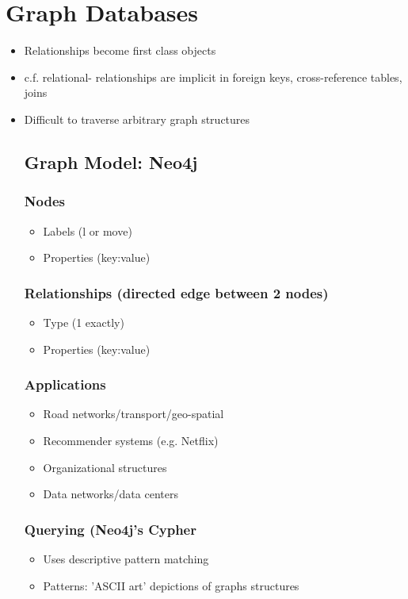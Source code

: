 \documentclass[12pt]{article}
\begin{document}
	\section*{Graph Databases}
		\begin{itemize}
			\item
				Relationships become first class objects
			\item
				c.f. relational- relationships are implicit in foreign keys, cross-reference tables, joins
			\item
				Difficult to traverse arbitrary graph structures
			\subsection*{Graph Model: Neo4j}
				\subsubsection*{Nodes}
					\begin{itemize}
						\item
							Labels (l or move)
						\item
							Properties (key:value)
					\end{itemize}
				\subsubsection*{Relationships (directed edge between 2 nodes)}
					\begin{itemize}
						\item
							Type (1 exactly)
						\item
							Properties (key:value)
					\end{itemize}
				\subsubsection*{Applications}
					\begin{itemize}
						\item
							Road networks/transport/geo-spatial
						\item
							Recommender systems (e.g. Netflix)
						\item
							Organizational structures
						\item
							Data networks/data centers
					\end{itemize}
					\subsubsection*{Querying (Neo4j's Cypher}
					\begin{itemize}
						\item
							Uses descriptive pattern matching
						\item
							Patterns: 'ASCII art' depictions of graphs structures
					\end{itemize}

		\end{itemize}
\end{document}
